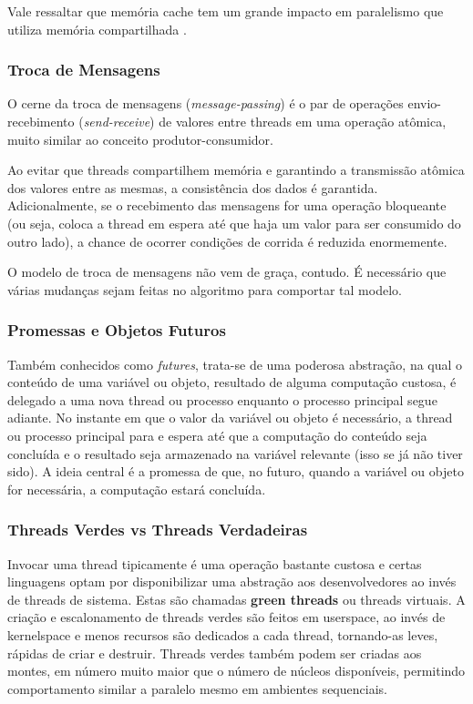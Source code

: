 \documentclass{article}
\begin{document}
Vale ressaltar que memória cache tem um grande impacto em paralelismo que utiliza memória compartilhada \cite{pacheco11}.

\subsubsection{Troca de Mensagens}
\label{sssec:troca mensagens}

O cerne da troca de mensagens (\emph{message-passing}) é o par de operações envio-recebimento ({\it send-receive}) de valores entre threads em uma operação atômica, muito similar ao conceito produtor-consumidor.

Ao evitar que threads compartilhem memória e garantindo a transmissão atômica dos valores entre as mesmas, a consistência dos dados é garantida. Adicionalmente, se o recebimento das mensagens for uma operação bloqueante (ou seja, coloca a thread em espera até que haja um valor para ser consumido do outro lado), a chance de ocorrer condições de corrida é reduzida enormemente.

O modelo de troca de mensagens não vem de graça, contudo. É necessário que várias mudanças sejam feitas no algoritmo para comportar tal modelo.

\subsubsection{Promessas e Objetos Futuros}
\label{sssec:promessas objetos futuros}

Também conhecidos como {\it futures}, trata-se de uma poderosa abstração, na qual o conteúdo de uma variável ou objeto, resultado de alguma computação custosa, é delegado a uma nova thread ou processo enquanto o processo principal segue adiante. No instante em que o valor da variável ou objeto é necessário, a thread ou processo principal para e espera até que a computação do conteúdo seja concluída e o resultado seja armazenado na variável relevante (isso se já não tiver sido). A ideia central é a promessa de que, no futuro, quando a variável ou objeto for necessária, a computação estará concluída.

\subsubsection{Threads Verdes vs Threads Verdadeiras}
\label{sssec:threads verdes}

Invocar uma thread tipicamente é uma operação bastante custosa e certas linguagens optam por disponibilizar uma abstração aos desenvolvedores ao invés de threads de sistema. Estas são chamadas \textbf{green threads} ou threads virtuais. A criação e escalonamento de threads verdes são feitos em userspace, ao invés de kernelspace e menos recursos são dedicados a cada thread, tornando-as leves, rápidas de criar e destruir. Threads verdes também podem ser criadas aos montes, em número muito maior que o número de núcleos disponíveis, permitindo comportamento similar a paralelo mesmo em ambientes sequenciais.
\end{document}

